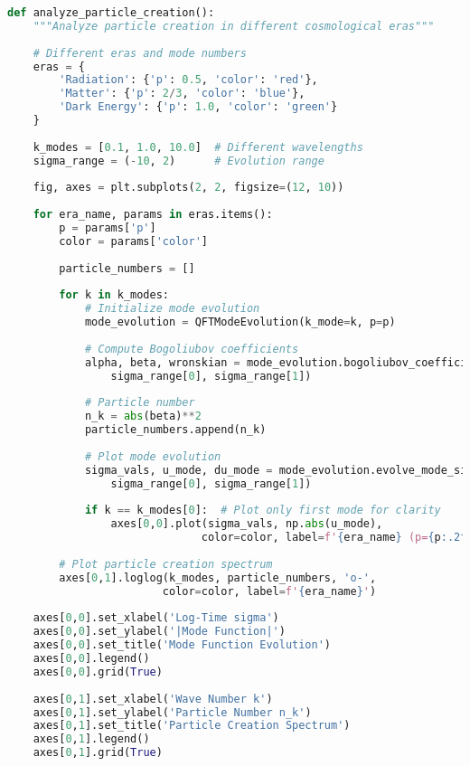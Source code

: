 \documentclass[11pt,a4paper]{article}
\begin{document}
\begin{lstlisting}[language=Python, caption=Cosmological Particle Creation]
def analyze_particle_creation():
    """Analyze particle creation in different cosmological eras"""
    
    # Different eras and mode numbers
    eras = {
        'Radiation': {'p': 0.5, 'color': 'red'},
        'Matter': {'p': 2/3, 'color': 'blue'}, 
        'Dark Energy': {'p': 1.0, 'color': 'green'}
    }
    
    k_modes = [0.1, 1.0, 10.0]  # Different wavelengths
    sigma_range = (-10, 2)      # Evolution range
    
    fig, axes = plt.subplots(2, 2, figsize=(12, 10))
    
    for era_name, params in eras.items():
        p = params['p']
        color = params['color']
        
        particle_numbers = []
        
        for k in k_modes:
            # Initialize mode evolution
            mode_evolution = QFTModeEvolution(k_mode=k, p=p)
            
            # Compute Bogoliubov coefficients
            alpha, beta, wronskian = mode_evolution.bogoliubov_coefficients(
                sigma_range[0], sigma_range[1])
            
            # Particle number
            n_k = abs(beta)**2
            particle_numbers.append(n_k)
            
            # Plot mode evolution
            sigma_vals, u_mode, du_mode = mode_evolution.evolve_mode_sigma(
                sigma_range[0], sigma_range[1])
            
            if k == k_modes[0]:  # Plot only first mode for clarity
                axes[0,0].plot(sigma_vals, np.abs(u_mode), 
                              color=color, label=f'{era_name} (p={p:.2f})')
        
        # Plot particle creation spectrum
        axes[0,1].loglog(k_modes, particle_numbers, 'o-', 
                        color=color, label=f'{era_name}')
    
    axes[0,0].set_xlabel('Log-Time sigma')
    axes[0,0].set_ylabel('|Mode Function|')
    axes[0,0].set_title('Mode Function Evolution')
    axes[0,0].legend()
    axes[0,0].grid(True)
    
    axes[0,1].set_xlabel('Wave Number k')
    axes[0,1].set_ylabel('Particle Number n_k')
    axes[0,1].set_title('Particle Creation Spectrum')
    axes[0,1].legend()
    axes[0,1].grid(True)
    

\end{lstlisting}
\end{document}
